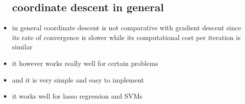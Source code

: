 \documentclass{article}
\begin{document}
\begin{itemize}
\subsection{coordinate descent in general}
\item in general coordinate descent is not comparative with gradient descent since its rate of convergence is slower while its computational cost per iteration is similar 
\item it however works really well for certain problems 
\item and it is very simple and easy to implement 
\item it works well for lasso regression and SVMs

\end{itemize}
\end{document}
